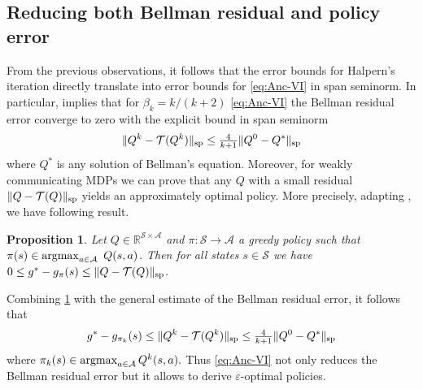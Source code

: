 \documentclass{article}
\newcommand{\Argmax}{\mathop{\rm argmax}}
\newcommand{\cA}{\mathcal{A}}
\newcommand{\cS}{\mathcal{S}}
\newcommand{\T}{\mathcal{T}}
\newcommand{\reals}{\mathbb{R}}
\renewcommand{\sp}[1]{\|{#1}\|_\text{\rm sp}}
\theoremstyle{plain}
\newtheorem{proposition}[theorem]{Proposition}
\theoremstyle{definition}
\theoremstyle{remark}
\begin{document}
\subsection{Reducing both Bellman residual and policy error }
From the previous observations, it follows that the error bounds for Halpern's iteration directly translate into error bounds for \eqref{eq:Anc-VI} in span seminorm. 
In particular, \citet[Lemma 5]{sabach2017first} implies that for $\beta_k=k/(k+2)$ \eqref{eq:Anc-VI} the Bellman residual error converge to zero with the explicit 
bound in span seminorm
$$\sp{Q^k-\T(Q^k)}\leq\mbox{$\frac{4}{k+1}$}\sp{Q^0-Q^*}$$ where $Q^{*}$ is any solution of Bellman's equation. 
Moreover, for weakly communicating MDPs we can prove that any $Q$ with a small residual $\sp{Q-\T(Q)}$ yields an approximately optimal policy. More precisely, adapting \citep[Theorem 9.1.7]{10.5555/528623}, we have following result.   
\begin{proposition}\label{prop:err}
 Let $Q\in\reals^{\cS\times\cA}$ and $\pi:\cS\to\cA$ a greedy policy such that $\pi(s)\in\Argmax_{a\in\cA}~Q(s,a)$. Then for all states $s\in \cS$ we have $0\leq g^*-g_\pi(s)\leq\sp{Q-\T(Q)}$.
\end{proposition}
Combining \cref{prop:err} with the general estimate of the Bellman residual error, it follows that 
$$  g^*-g_{\pi_k}(s) \leq \sp{Q^k-\T(Q^k)} \leq\mbox{$\frac{4}{k+1}$}\sp{Q^0-Q^*}$$
where $\pi_k(s)\in\Argmax_{a \in \cA} Q^k(s,a).$ Thus \eqref{eq:Anc-VI} not only reduces the Bellman residual error but it allows to derive $\varepsilon$-optimal policies. 
\end{document}
